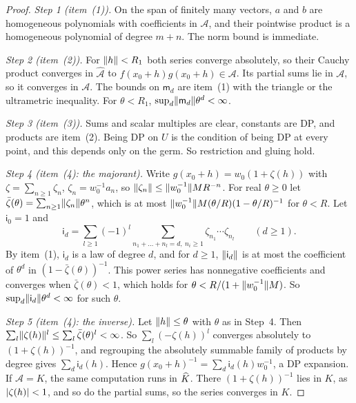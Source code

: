 \begin{proof}
\emph{Step 1 (item~(1)).} On the span of finitely many vectors, $a$ and $b$ are homogeneous polynomials with coefficients in $\mathcal A$, and their pointwise product is a homogeneous polynomial of degree $m+n$. The norm bound is immediate.

\emph{Step 2 (item~(2)).} For $\lVert h\rVert<R_1$ both series converge absolutely, so their Cauchy product converges in $\widehat{\mathcal A}$ to $f(x_0+h)g(x_0+h)\in\mathcal A$. Its partial sums lie in $\mathcal A$, so it converges in $\mathcal A$. The bounds on $\mathsf m_d$ are item~(1) with the triangle or the ultrametric inequality. For $\theta<R_1$, $\sup_d\lVert \mathsf m_d\rVert\theta^d<\infty$.

\emph{Step 3 (item~(3)).} Sums and scalar multiples are clear, constants are DP, and products are item~(2). Being DP on $U$ is the condition of being DP at every point, and this depends only on the germ. So restriction and gluing hold.

\emph{Step 4 (item~(4): the majorant).} Write $g(x_0+h)=w_0(1+\zeta(h))$ with $\zeta=\sum_{n\ge1}\zeta_n$, $\zeta_n=w_0^{-1}a_n$, so $\lVert \zeta_n\rVert\le\lVert w_0^{-1}\rVert MR^{-n}$. For real $\theta\ge0$ let $\bar\zeta(\theta)=\sum_{n\ge1}\lVert \zeta_n\rVert\theta^n$, which is at most $\lVert w_0^{-1}\rVert M(\theta/R)(1-\theta/R)^{-1}$ for $\theta<R$. Let $\mathsf i_0=1$ and
\[
 \mathsf i_d=\sum_{l\ge1}(-1)^l\sum_{n_1+\dots+n_l=d,\ n_i\ge1}\zeta_{n_1}\cdots\zeta_{n_l}\qquad(d\ge1).
\]
By item~(1), $\mathsf i_d$ is a law of degree $d$, and for $d\ge1$, $\lVert \mathsf i_d\rVert$ is at most the coefficient of $\theta^d$ in $(1-\bar\zeta(\theta))^{-1}$. This power series has nonnegative coefficients and converges when $\bar\zeta(\theta)<1$, which holds for $\theta<R/(1+\lVert w_0^{-1}\rVert M)$. So $\sup_d\lVert \mathsf i_d\rVert\theta^d<\infty$ for such $\theta$.

\emph{Step 5 (item~(4): the inverse).} Let $\lVert h\rVert\le\theta$ with $\theta$ as in Step~4. Then $\sum_l\lVert \zeta(h)\rVert^l\le\sum_l\bar\zeta(\theta)^l<\infty$. So $\sum_l(-\zeta(h))^l$ converges absolutely to $(1+\zeta(h))^{-1}$, and regrouping the absolutely summable family of products by degree gives $\sum_d\mathsf i_d(h)$. Hence $g(x_0+h)^{-1}=\sum_d\mathsf i_d(h)w_0^{-1}$, a DP expansion. If $\mathcal A=K$, the same computation runs in $\widehat K$. There $(1+\zeta(h))^{-1}$ lies in $K$, as $\lvert \zeta(h)\rvert<1$, and so do the partial sums, so the series converges in $K$.


\end{proof}
